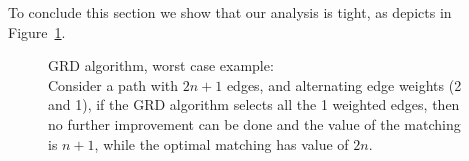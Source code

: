 To conclude this section we show that our analysis is tight, 
as depicts in Figure~\ref{fig:grd worst}.
\begin{figure}
\centering

\caption{
\label{fig:grd worst}
GRD algorithm, worst case example: \\
Consider a path with $2n + 1$ edges, 
and alternating edge weights (2 and 1),
if the GRD algorithm selects all the 1 weighted edges,
then no further improvement can be done and the value of the matching is $n + 1$,
while the optimal matching has value of $2n$. 
}
\end{figure}